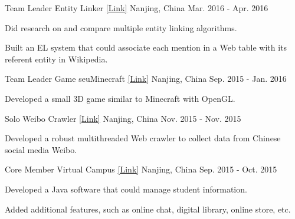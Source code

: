 \begin{cventries}
  \cventry
    {Team Leader} %
    {Entity Linker \href{https://github.com/acmom/entity-linker}{[\underline{Link}]}} %
    {Nanjing, China} %
    {Mar. 2016 - Apr. 2016} %
    {
      \begin{cvitems} %
        \item {Did research on and compare multiple entity linking algorithms.}
        \item {Built an EL system that could associate each mention in a Web table with its referent entity in Wikipedia.}
      \end{cvitems}
    }

  \cventry
    {Team Leader} %
    {Game seuMinecraft \href{https://github.com/yanshengjia/openGL/tree/master/lab5(final)}{[\underline{Link}]}} %
    {Nanjing, China} %
    {Sep. 2015 - Jan. 2016} %
    {
      \begin{cvitems} %
        \item {Developed a small 3D game similar to Minecraft with OpenGL.}
      \end{cvitems}
    }

  \cventry
    {Solo} %
    {Weibo Crawler \href{https://github.com/yanshengjia/crawler/tree/master/weiboCrawler}{[\underline{Link}]}} %
    {Nanjing, China} %
    {Nov. 2015 - Nov. 2015} %
    {
      \begin{cvitems} %
        \item {Developed a robust multithreaded Web crawler to collect data from Chinese social media Weibo.}
      \end{cvitems}
    }

  \cventry
    {Core Member} %
    {Virtual Campus \href{https://github.com/acmom/vcampus}{[\underline{Link}]}} %
    {Nanjing, China} %
    {Sep. 2015 - Oct. 2015} %
    {
      \begin{cvitems} %
        \item {Developed a Java software that could manage student information.}
        \item {Added additional features, such as online chat, digital library, online store, etc.}
      \end{cvitems}
    }

\end{cventries}

